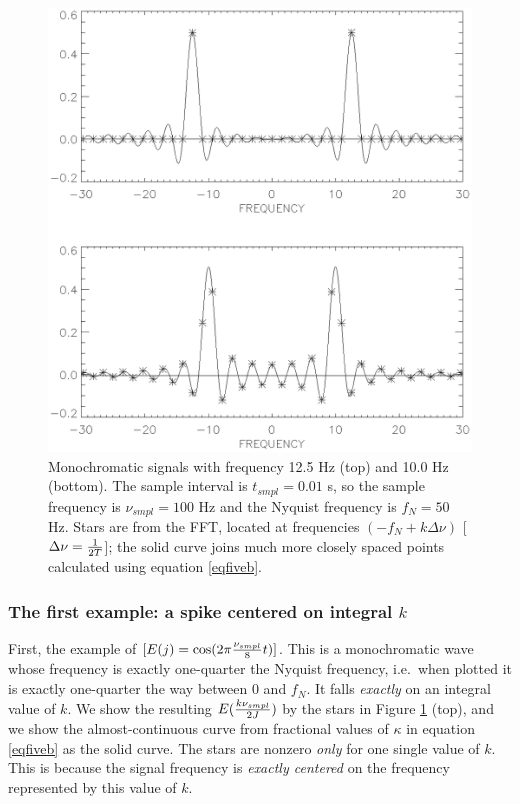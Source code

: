 \documentclass[psfig,preprint]{aastex}
\begin{document}
\begin{figure}[h!]
\begin{center}
\leavevmode
\includegraphics{fig3.ps}
\end{center}

\caption{Monochromatic signals with frequency 12.5 Hz (top) and 10.0 Hz
(bottom). The sample interval is $t_{smpl}= 0.01$ s, so the sample
frequency is $\nu_{smpl} = 100$ Hz and the Nyquist frequency is $f_N=50$
Hz. Stars are from the FFT, located at frequencies $(-f_N + k \Delta
\nu)$ [$\Delta \nu= {1 \over 2T}$]; the solid curve joins much more
closely spaced points calculated using equation \ref{eqfiveb}. 
\label{figthree}} \end{figure}

\subsubsection{The first example: a spike centered on integral $k$}

	First, the example of $[E(j) = \cos(2 \pi {\nu_{smpl} \over 8}
t)]$. This is a monochromatic wave whose frequency is exactly
one-quarter the Nyquist frequency, i.e.\ when plotted it is exactly
one-quarter the way between 0 and $f_N$. It falls {\it exactly} on an
integral  value of $k$. We show the resulting $E({k \nu_{smpl} \over
2J})$ by the stars in Figure \ref{figthree} (top), and we show the
almost-continuous curve from fractional values of $\kappa$ in equation
\ref{eqfiveb} as the solid curve. The stars are nonzero {\it only} for
one single value of $k$. This is because the signal frequency is {\it
exactly centered} on the frequency represented by this value of $k$. 
\end{document}
